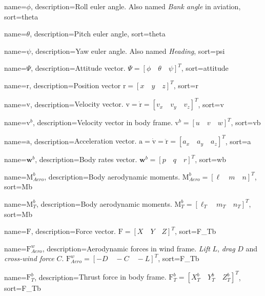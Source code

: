 {
	name={$\phi$},
  	description={Roll euler angle. Also named \textit{Bank angle} in aviation},
  	sort=theta
}

{
	name={$\theta$},
  	description={Pitch euler angle},
  	sort=theta
}

{
	name={$\psi$},
  	description={Yaw euler angle. Also named \textit{Heading}},
  	sort=psi
}

{
	name={$\Psi$},
	description={Attitude vector. $\Psi = [\phi \quad \theta \quad \psi]^T$},
	sort=attitude
}

{
	name={$\bm{\mathrm{r}}$},
	description={Position vector $\bm{\mathrm{r}} = [x \quad y \quad z]^{T}$},
  	sort=r
}

{
	name={$\bm{\mathrm{v}}$},
	description={Velocity vector. $\bm{\mathrm{v}} = \bm{\mathrm{\dot{r}}} = [v_x \quad v_y \quad v_z]^T$},
	sort=v
}

{
	name={$\bm{\mathrm{v}}^b$},
	description={Velocity vector in body frame. $\bm{\mathrm{v}}^b = [u \quad v \quad w]^T$},
	sort=vb
}

{
	name={$\bm{\mathrm{a}}$},
	description={Acceleration vector. $\bm{\mathrm{a}} = \bm{\mathrm{\dot{v}}} = \bm{\mathrm{\ddot{r}}} = [a_x \quad a_y \quad a_z]^T$},
	sort=a
}

{
	name={$\bm{w}^b$},
	description={Body rates vector. $\bm{w}^b = [p \quad q \quad r]^T$},
	sort=wb
}

{
	name={$\bm{\mathrm{M}}_{Aero}^b$},
	description={Body aerodynamic moments. $\bm{\mathrm{M}}_{Aero}^b = [\ell \quad m \quad n]^T$},
	sort=Mb
}

{
	name={$\bm{\mathrm{M}}_T^b$},
	description={Body aerodynamic moments. $\bm{\mathrm{M}}_T^b = [\ell_T \quad m_T \quad n_T]^T$},
	sort=Mb
}

{
	name={$\bm{\mathrm{F}}$},
	description={Force vector. $\bm{\mathrm{F}} = [X \quad Y \quad Z]^T$},
	sort=F_Tb
}

{
	name={$\bm{\mathrm{F}}_{Aero}^w$},
	description={Aerodynamic forces in wind frame. \textit{Lift} $L$, \textit{drag} $D$ and \textit{cross-wind force} $C$. $\bm{\mathrm{F}}_{Aero}^w = [-D \quad -C \quad -L]^T$},
	sort=F_Tb
}

{
	name={$\bm{\mathrm{F}}_T^b$},
	description={Thrust force in body frame. $\bm{\mathrm{F}}_T^b = [X_T^b \quad Y_T^b \quad Z_T^b]^T$},
	sort=F_Tb
}


